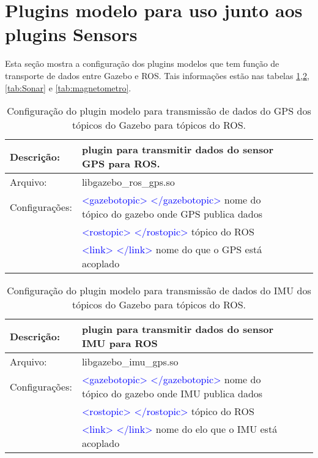 				

	\section{Plugins modelo para uso junto aos plugins Sensors}

		Esta seção mostra a configuração dos plugins modelos que tem função de transporte de dados entre Gazebo e ROS. Tais informações estão nas tabelas \ref{tab:GPS},\ref{tab:IMU},\ref{tab:Sonar} e \ref{tab:magnetometro}.

		\begin{table}[h]
		\centering
		\begin{tabular}{|r|lrrr|}
		\hline
		\multicolumn{1}{|l|}{Descrição: } & plugin para transmitir dados do sensor GPS para ROS. &       &       &     \\
		\hline
		\multicolumn{1}{|l|}{Arquivo: } & libgazebo\_ros\_gps.so &       &        &  \\
		\hline
		\multicolumn{1}{|l|}{Configurações: } & \textcolor{blue}{<gazebotopic> </gazebotopic>} nome do tópico do gazebo onde GPS publica dados &       &       &         \\
		& \textcolor{blue}{<rostopic> </rostopic>} tópico do ROS &       &       &         \\
		& \textcolor{blue}{<link> </link>} nome do  que o GPS está acoplado &       &       &   \\
		\hline
		\end{tabular}%
		\caption{Configuração do plugin modelo para transmissão de dados do GPS dos tópicos do Gazebo para tópicos do ROS.}
		\label{tab:GPS}%
		\end{table}%
		
		\begin{table}[h]
		\centering
		\begin{tabular}{|r|lrrr|}
		\hline
		\multicolumn{1}{|l|}{Descrição: } & plugin para transmitir dados do sensor IMU para ROS &       &       &     \\
		\hline
		\multicolumn{1}{|l|}{Arquivo: } & libgazebo\_imu\_gps.so &       &        &  \\
		\hline
		\multicolumn{1}{|l|}{Configurações: } & \textcolor{blue}{<gazebotopic> </gazebotopic>} nome do tópico do gazebo onde IMU publica dados &       &       &      \\
		& \textcolor{blue}{<rostopic> </rostopic>} tópico do ROS &       &       &      \\
		& \textcolor{blue}{<link> </link>} nome do elo que o IMU está acoplado &       &       &   \\
		\hline
		\end{tabular}%
		\caption{Configuração do plugin modelo para transmissão de dados do IMU dos tópicos do Gazebo para tópicos do ROS.}
		\label{tab:IMU}%
		\end{table}%
		
